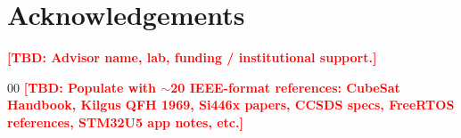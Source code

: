 \documentclass[conference]{IEEEtran}
\newcommand{\tbd}[1]{\textcolor{red}{\textbf{[TBD: #1]}}}
\begin{document}
\section*{Acknowledgements}
\tbd{Advisor name, lab, funding / institutional support.}

\begin{thebibliography}{00}
 \tbd{Populate with $\sim$20 IEEE-format references: CubeSat Handbook, Kilgus QFH 1969, Si446x papers, CCSDS specs, FreeRTOS references, STM32U5 app notes, etc.}
\end{thebibliography}
\end{document}
